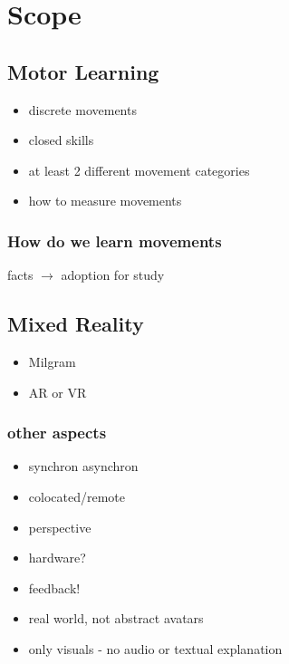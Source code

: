 \chapter{Scope}
\section{Motor Learning}
\begin{itemize}
	\item discrete movements
	\item closed skills
	\item at least 2 different movement categories
	\item how to measure movements
\end{itemize}
\subsection{How do we learn movements}
facts $\rightarrow$ adoption for study
\section{Mixed Reality}
\begin{itemize}
	\item Milgram
	\item AR or VR
\end{itemize}
\subsection{other aspects}
\begin{itemize}
	\item synchron asynchron
	\item colocated/remote
	\item perspective
	\item hardware?
	\item feedback!
	\item real world, not abstract avatars
	\item only visuals - no audio or textual explanation
\end{itemize}

